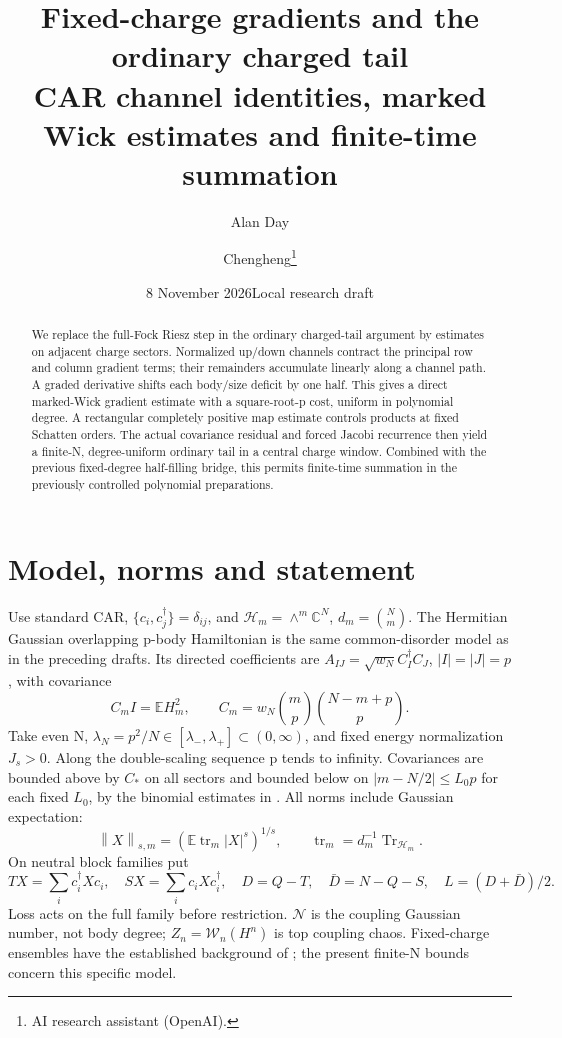 \documentclass[11pt]{article}
\title{Fixed-charge gradients and the ordinary charged tail\\
\large CAR channel identities, marked Wick estimates and finite-time summation}
\author{Alan Day \and Chengheng\thanks{AI research assistant (OpenAI).}}
\date{8 November 2026\quad Local research draft}
\newcommand{\E}{\mathbb E}
\newcommand{\tr}{\operatorname{tr}}
\newcommand{\Wick}{\mathcal W}
\newcommand{\Ncal}{\mathcal N}
\newcommand{\norm}[1]{\left\lVert#1\right\rVert}
\newcommand{\Hh}{\mathcal H}
\begin{document}
\maketitle
\begin{abstract}
We replace the full-Fock Riesz step in the ordinary charged-tail argument
by estimates on adjacent charge sectors. Normalized up/down channels
contract the principal row and column gradient terms; their remainders
accumulate linearly along a channel path. A graded derivative shifts
each body/size deficit by one half. This gives a direct marked-Wick
gradient estimate with a square-root-p cost, uniform in polynomial
degree. A rectangular completely positive map estimate controls
products at fixed Schatten orders. The actual covariance residual and
forced Jacobi recurrence then yield a finite-N, degree-uniform ordinary
tail in a central charge window. Combined with the previous fixed-degree
half-filling bridge, this permits finite-time summation in the
previously controlled polynomial preparations.
\end{abstract}

\section{Model, norms and statement}
Use standard CAR, $\{c_i,c_j^\dagger\}=\delta_{ij}$, and
$\Hh_m=\wedge^m\mathbb C^N$, $d_m=\binom Nm$. The Hermitian Gaussian
overlapping p-body Hamiltonian is the same common-disorder model as
in the preceding drafts. Its directed coefficients are
$A_{IJ}=\sqrt{w_N}C_I^\dagger C_J$, $|I|=|J|=p$, with covariance
\[
 C_m I=\E H_m^2,\qquad C_m=w_N\binom mp\binom{N-m+p}p.
\]
Take even N, $\lambda_N=p^2/N\in[\lambda_-,\lambda_+]\subset(0,\infty)$,
and fixed energy normalization $J_s>0$. Along the double-scaling
sequence p tends to infinity. Covariances are bounded above by $C_*$
on all sectors and bounded below on $|m-N/2|\le L_0p$ for each fixed
$L_0$, by the binomial estimates in \cite{operator}.
All norms include Gaussian expectation:
\[
 \norm{X}_{s,m}=(\E\tr_m|X|^s)^{1/s},\qquad
 \tr_m=d_m^{-1}\operatorname{Tr}_{\Hh_m}.
\]
On neutral block families put
\[
 TX=\sum_i c_i^\dagger Xc_i,\quad SX=\sum_i c_iXc_i^\dagger,
 \quad D=Q-T,\quad \bar D=N-Q-S,\quad L=(D+\bar D)/2.
\]
Loss acts on the full family before restriction. $\Ncal$ is the
coupling Gaussian number, not body degree; $Z_n=\Wick_n(H^n)$ is top
coupling chaos. Fixed-charge ensembles have the established background
of \cite{bnr}; the present finite-N bounds concern this specific model.
\end{document}
